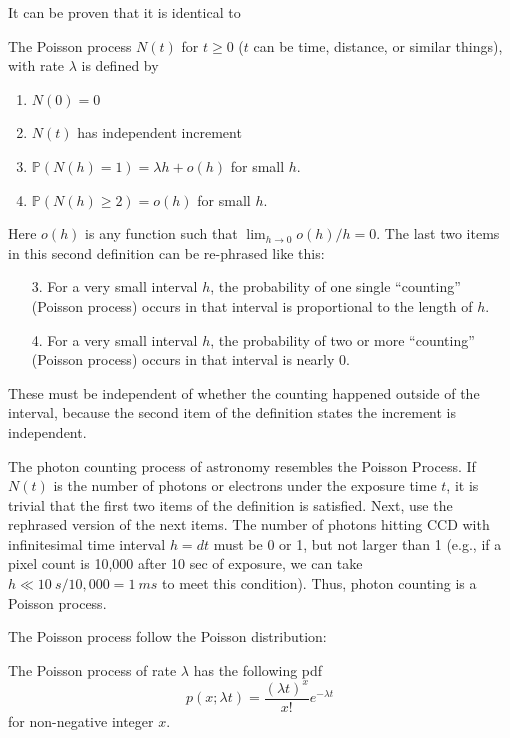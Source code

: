 It can be proven that it is identical to 

\begin{defn}
The Poisson process $ N(t) $ for $ t \ge 0 $ ($ t $ can be time, distance, or similar things), with rate $ \lambda $ is defined by
\begin{enumerate}
\item $ N(0) = 0 $
\item $ N(t) $ has independent increment
\item $ \mathbb{P}(N(h) = 1) = \lambda h + o(h) $ for small $ h $.
\item $ \mathbb{P}(N(h) \ge 2) = o(h) $ for small $ h $.
\end{enumerate}
\end{defn}

Here $ o(h) $ is any function such that $ \lim_{h \rightarrow 0} o(h) / h = 0 $. The last two items in this second definition can be re-phrased like this:
\begin{itemize}
\item [3.] For a very small interval $ h $, the probability of one single ``counting'' (Poisson process) occurs in that interval is proportional to the length of $ h $.
\item [4.] For a very small interval $ h $, the probability of two or more ``counting'' (Poisson process) occurs in that interval is nearly 0.
\end{itemize}
These must be independent of whether the counting happened outside of the interval, because the second item of the definition states the increment is independent.

\begin{ex}
The photon counting process of astronomy resembles the Poisson Process. If $ N(t) $ is the number of photons or electrons under the exposure time $ t $, it is trivial that the first two items of the definition is satisfied. Next, use the rephrased version of the next items. The number of photons hitting CCD with infinitesimal time interval $ h = dt $ must be 0 or 1, but not larger than 1 (e.g., if a pixel count is 10,000 after 10 sec of exposure, we can take $ h \ll \SI{10}{s} / 10,000 = \SI{1}{ms} $ to meet this condition). Thus, photon counting is a Poisson process.
\end{ex}

The Poisson process follow the Poisson distribution:

\begin{defn} \label{def: Pois pdf}
The Poisson process of rate $ \lambda $ has the following pdf
\begin{equation} \label{eq: Pois pdf}
  p(x; \lambda t) = \frac{(\lambda t)^{x}}{x!} e^{-\lambda t}
\end{equation}
for non-negative integer $ x $.
\end{defn}

